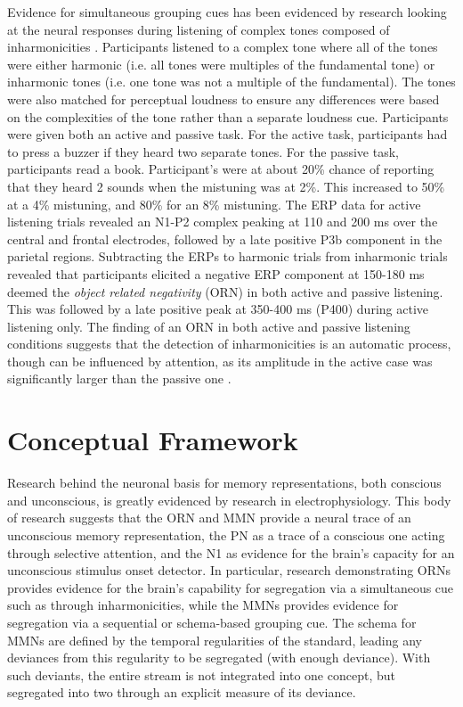 \documentclass[a4paper,10pt,final]{ThesisStyle}
\begin{document}
Evidence for simultaneous grouping cues has been evidenced by research looking at the neural responses during listening of complex tones composed of inharmonicities \cite{Alain2001,Alain2002}.  Participants listened to a complex tone where all of the tones were either harmonic (i.e. all tones were multiples of the fundamental tone) or inharmonic tones (i.e. one tone was not a multiple of the fundamental).  The tones were also matched for perceptual loudness to ensure any differences were based on the complexities of the tone rather than a separate loudness cue.  Participants were given both an active and passive task.  For the active task, participants had to press a buzzer if they heard two separate tones.  For the passive task, participants read a book.   Participant's were at about 20\% chance of reporting that they heard 2 sounds when the mistuning was at 2\%.  This increased to 50\% at a 4\% mistuning, and 80\% for an 8\% mistuning.  The ERP data for active listening trials revealed an N1-P2 complex peaking at 110 and 200 ms over the central and frontal electrodes, followed by a late positive P3b component in the parietal regions.   Subtracting the ERPs to harmonic trials from inharmonic trials revealed that participants elicited a negative ERP component at 150-180 ms deemed the \textit{object related negativity} (ORN) in both active and passive listening.  This was followed by a late positive peak at 350-400 ms (P400) during active listening only.  The finding of an ORN in both active and passive listening conditions suggests that the detection of inharmonicities is an automatic process, though can be influenced by attention, as its amplitude in the active case was significantly larger than the passive one \cite{Alain2001,Alain2002}.

\section{Conceptual Framework}

Research behind the neuronal basis for memory representations, both conscious and unconscious, is greatly evidenced by research in electrophysiology.  This body of research suggests that the ORN and MMN provide a neural trace of an unconscious memory representation, the PN as a trace of a conscious one acting through selective attention, and the N1 as evidence for the brain's capacity for an unconscious stimulus onset detector.  In particular, research demonstrating ORNs provides evidence for the brain's capability for segregation via a simultaneous cue such as through inharmonicities, while the MMNs provides evidence for segregation via a sequential or schema-based grouping cue.  The schema for MMNs are defined by the temporal regularities of the standard, leading any deviances from this regularity to be segregated (with enough deviance).  With such deviants, the entire stream is not integrated into one concept, but segregated into two through an explicit measure of its deviance. 
\end{document}
